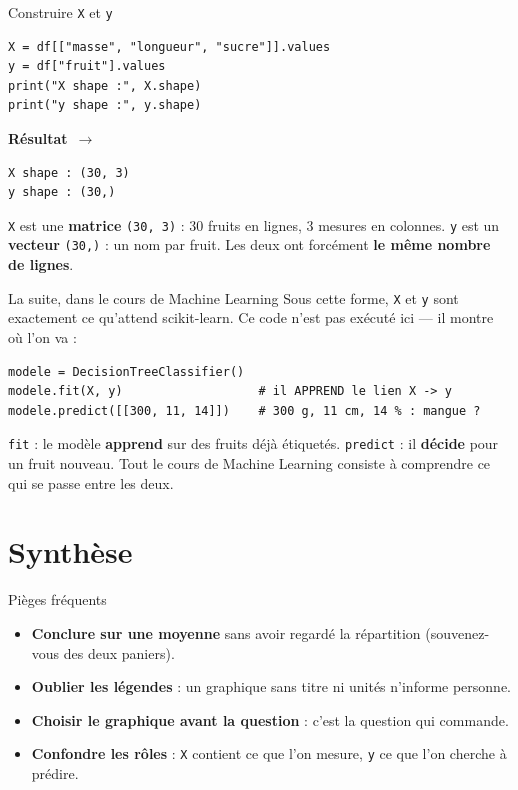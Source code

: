 \documentclass[aspectratio=169,11pt]{beamer}
\newcommand{\resultat}{{\scriptsize\textbf{R\'esultat}~$\rightarrow$}\par\vspace{1pt}}
\begin{document}
\begin{frame}[fragile]{Construire \texttt{X} et \texttt{y}}
\begin{lstlisting}
X = df[["masse", "longueur", "sucre"]].values
y = df["fruit"].values
print("X shape :", X.shape)
print("y shape :", y.shape)
\end{lstlisting}
\resultat
\begin{lstlisting}[style=out]
X shape : (30, 3)
y shape : (30,)
\end{lstlisting}
{\small \texttt{X} est une \textbf{matrice} \texttt{(30, 3)} : 30 fruits en lignes, 3 mesures en colonnes. \texttt{y} est un \textbf{vecteur} \texttt{(30,)} : un nom par fruit. Les deux ont forcément \textbf{le même nombre de lignes}.}
\end{frame}

\begin{frame}[fragile]{La suite, dans le cours de Machine Learning}
{\small Sous cette forme, \texttt{X} et \texttt{y} sont exactement ce qu'attend scikit-learn. Ce code n'est pas exécuté ici — il montre où l'on va :}
\begin{lstlisting}
modele = DecisionTreeClassifier()
modele.fit(X, y)                   # il APPREND le lien X -> y
modele.predict([[300, 11, 14]])    # 300 g, 11 cm, 14 % : mangue ?
\end{lstlisting}
\begin{ucadret}
{\small \texttt{fit} : le modèle \textbf{apprend} sur des fruits déjà étiquetés. \texttt{predict} : il \textbf{décide} pour un fruit nouveau. Tout le cours de Machine Learning consiste à comprendre ce qui se passe entre les deux.}
\end{ucadret}
\end{frame}

\section{Synthèse}

\begin{frame}{Pièges fréquents}
\begin{itemize}\small
  \item \textbf{Conclure sur une moyenne} sans avoir regardé la répartition (souvenez-vous des deux paniers).
  \item \textbf{Oublier les légendes} : un graphique sans titre ni unités n'informe personne.
  \item \textbf{Choisir le graphique avant la question} : c'est la question qui commande.
  \item \textbf{Confondre les rôles} : \texttt{X} contient ce que l'on mesure, \texttt{y} ce que l'on cherche à prédire.
\end{itemize}
\end{frame}
\end{document}
